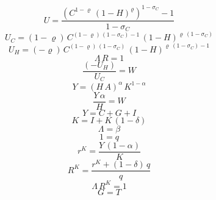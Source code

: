\begin{dmath}
{U}=\frac{\left({C}^{1-{{\varrho}}}\, \left(1-{H}\right)^{{{\varrho}}}\right)^{1-{{\sigma_{C}}}}-1}{1-{{\sigma_{C}}}}
\end{dmath}
\begin{dmath}
{U_C}=\left(1-{{\varrho}}\right)\, {C}^{\left(1-{{\varrho}}\right)\, \left(1-{{\sigma_{C}}}\right)-1}\, \left(1-{H}\right)^{{{\varrho}}\, \left(1-{{\sigma_{C}}}\right)}
\end{dmath}
\begin{dmath}
{U_H}=\left(-{{\varrho}}\right)\, {C}^{\left(1-{{\varrho}}\right)\, \left(1-{{\sigma_{C}}}\right)}\, \left(1-{H}\right)^{{{\varrho}}\, \left(1-{{\sigma_{C}}}\right)-1}
\end{dmath}
\begin{dmath}
{\Lambda}\, {R}=1
\end{dmath}
\begin{dmath}
\frac{\left(-{U_H}\right)}{{U_C}}={W}
\end{dmath}
\begin{dmath}
{Y}=\left({H}\, {A}\right)^{{{\alpha}}}\, {K}^{1-{{\alpha}}}
\end{dmath}
\begin{dmath}
\frac{{Y}\, {{\alpha}}}{{H}}={W}
\end{dmath}
\begin{dmath}
{Y}={C}+{G}+{I}
\end{dmath}
\begin{dmath}
{K}={I}+{K}\, \left(1-{{\delta}}\right)
\end{dmath}
\begin{dmath}
{\Lambda}={{\beta}}
\end{dmath}
\begin{dmath}
1={q}
\end{dmath}
\begin{dmath}
{r^{K}}=\frac{{Y}\, \left(1-{{\alpha}}\right)}{{K}}
\end{dmath}
\begin{dmath}
{R^{K}}=\frac{{r^{K}}+\left(1-{{\delta}}\right)\, {q}}{{q}}
\end{dmath}
\begin{dmath}
{\Lambda}\, {R^{K}}=1
\end{dmath}
\begin{dmath}
{G}={T}
\end{dmath}
